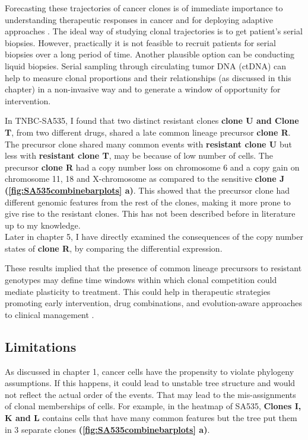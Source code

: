 Forecasting these trajectories of cancer clones is of immediate importance to understanding therapeutic responses in cancer and for deploying adaptive approaches \cite{Vasan2019-mt}. The ideal way of studying clonal trajectories is to get patient's serial biopsies. However, practically it is not feasible to recruit patients for serial biopsies over a long period of time. Another plausible option can be conducting liquid biopsies. Serial sampling through circulating tumor DNA (ctDNA) can help to measure clonal proportions and their relationships (as discussed in this chapter) in a non-invasive way and to generate a window of opportunity for intervention. 

In TNBC-SA535, I found that two distinct resistant clones \textbf{clone U and Clone T}, from two different drugs, shared a late common lineage precursor \textbf{clone R}. The precursor clone shared  many common events with \textbf{resistant clone U} but less with \textbf{resistant clone T}, may be because of low number of cells.
 The precursor \textbf{clone R} had a copy number loss on chromosome 6 and a copy gain on chromosome 11, 18 and X-chromosome as compared to the sensitive \textbf{clone J} \textbf{(\autoref{fig:SA535combinebarplots} a)}. This showed that the precursor clone had different genomic features from the rest of the clones, making it more prone to give rise to the resistant clones. This has not been described before in literature up to my knowledge.
 \\
 Later in chapter 5, I have directly examined the consequences of the copy number states of \textbf{clone R}, by comparing the differential expression.
 
 These results implied that the presence of common lineage precursors to resistant genotypes may define time windows within which clonal competition could mediate plasticity to treatment. This could help in therapeutic strategies promoting early intervention, drug combinations, and evolution-aware approaches to clinical management \cite{Acar2020-tf}.


\subsection{Limitations}

As discussed in chapter 1, cancer cells have the propensity to violate phylogeny assumptions. If this happens, it could lead to unstable tree structure and would not reflect the actual order of the events. That may lead to the mis-assignments of clonal memberships of cells. For example, in the heatmap of SA535, \textbf{Clones I, K and L} contains cells that have many common features but the tree put them in 3 separate clones  \textbf{(\autoref{fig:SA535combinebarplots} a)}. 

